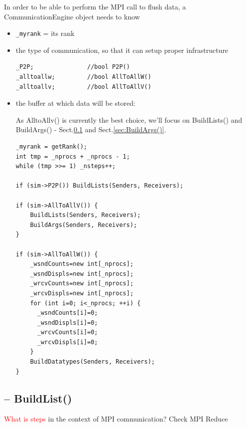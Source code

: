 In order to be able to perform the MPI call to flush data, a CommunicationEngine
object needs to know
\begin{itemize}
  \item \verb!_myrank! = its rank
  
  \item the type of communication, so that it can setup proper infrastructure
  
\begin{verbatim}
_P2P;               //bool P2P()
_alltoallw;         //bool AllToAllW()
_alltoallv;         //bool AllToAllV()
\end{verbatim}  

  \item the buffer at which data will be stored:
  
As AlltoAllv() is currently the best choice, we'll focus on BuildLists() and
BuildArgs() - Sect.\ref{sec:BuildList()} and Sect.\ref{sec:BuildArgs()}.
\begin{verbatim}
_myrank = getRank();
int tmp = _nprocs + _nprocs - 1;
while (tmp >>= 1) _nsteps++;

if (sim->P2P()) BuildLists(Senders, Receivers);

if (sim->AllToAllV()) {
	BuildLists(Senders, Receivers);
	BuildArgs(Senders, Receivers);
}

if (sim->AllToAllW()) {
	_wsndCounts=new int[_nprocs];
	_wsndDispls=new int[_nprocs];
	_wrcvCounts=new int[_nprocs];
	_wrcvDispls=new int[_nprocs];
	for (int i=0; i<_nprocs; ++i) {
	  _wsndCounts[i]=0;
	  _wsndDispls[i]=0;
	  _wrcvCounts[i]=0;
	  _wrcvDispls[i]=0;
	}
	BuildDatatypes(Senders, Receivers);
}
\end{verbatim}
  
\end{itemize}

\subsection{-- BuildList()}
\label{sec:BuildList()}

\textcolor{red}{What is steps} in the context of MPI communication? Check MPI
Reduce

